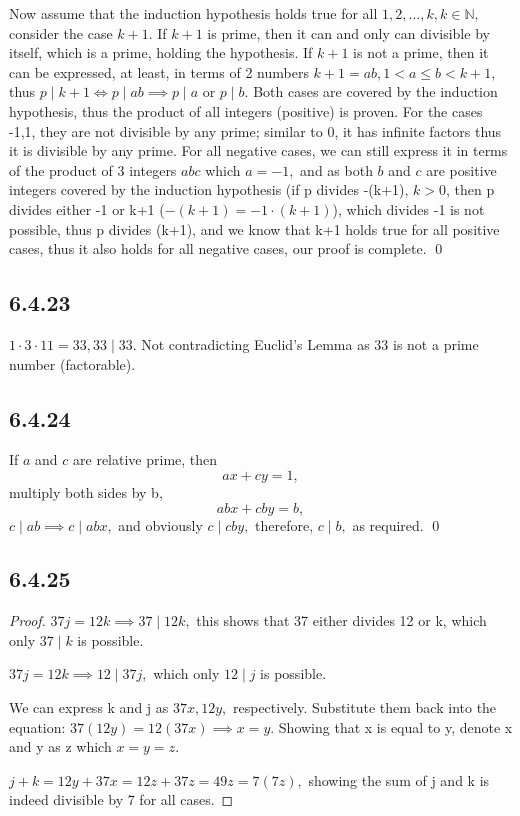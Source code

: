 \documentclass{article}
\begin{document}
Now assume that the induction hypothesis holds true for all $1,2,\ldots,k,k\in\mathbb{N},$ consider the case $k+1.$ If $k+1$ is prime, then it can and only can divisible by itself, which is a prime, holding the hypothesis. If $k+1$ is not a prime, then it can be expressed, at least, in terms of 2 numbers $k+1=ab, 1<a\leq b<k+1,$ thus $p\mid k+1 \iff p\mid ab \implies p\mid a $ or $p\mid b.$  Both cases are covered by the induction hypothesis, thus the product of all integers (positive) is proven. For the cases -1,1, they are not divisible by any prime; similar to 0, it has infinite factors thus it is divisible by any prime. For all negative cases, we can still express it in terms of the product of 3 integers $abc$ which $a=-1,$ and as both $b$ and $c$ are positive integers covered by the induction hypothesis (if p divides -(k+1), $k>0$, then p divides either -1 or k+1 ($-(k+1)=-1\cdot (k+1)$), which divides -1 is not possible, thus p divides (k+1), and we know that k+1 holds true for all positive cases, thus it also holds for all negative cases, our proof is complete. \qed

\subsection*{6.4.23}

$1\cdot3\cdot11=33,33\mid33$. Not contradicting Euclid's Lemma as 33 is not a prime number (factorable). 

\subsection*{6.4.24}

If $a$ and $c$ are relative prime, then $$ax+cy=1,$$ multiply both sides by b, $$abx+cby=b,$$ $c\mid ab \implies c\mid abx,$ and obviously $c\mid cby,$ therefore, $c\mid b,$ as required. \qed

\subsection*{6.4.25}

\begin{proof}
    
$37j=12k \implies 37\mid 12k,$ this shows that 37 either divides 12 or k, which only $37\mid k$ is possible.

$37j=12k\implies 12\mid 37j,$ which only $12\mid j$ is possible.

We can express k and j as $37x,12y,$ respectively. Substitute them back into the equation: $37(12y)=12(37x)\implies x=y.$ Showing that x is equal to y, denote x and y as z which $x=y=z.$ 

$j+k=12y+37x=12z+37z=49z=7(7z),$ showing the sum of j and k is indeed divisible by 7 for all cases. 
\end{proof}
\end{document}
